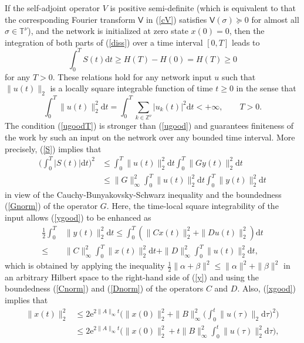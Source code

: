 \documentclass[letterpaper, 10pt, conference]{ieeeconf}  %
\def\<{\leqslant}           %
\def\>{\geqslant}           %
\def\mZ{\mathbb{Z}}    %
\def\re{\mathrm{e}}        %
\def\rd{\mathrm{d}}        %
\def\sV{\mathsf{V}}
\def\mT{\mathbb{T}}
\def\mZ{\mathbb{Z}}
\begin{document}
If the self-adjoint operator $V$ is positive semi-definite (which is equivalent to that the corresponding Fourier transform $\sV$ in (\ref{cV}) satisfies $\sV(\sigma) \succcurlyeq 0$ for almost all $\sigma \in \mT^\nu$), and the network is initialized at zero state $x(0)=0$, then the integration of both parts of (\ref{diss}) over a time interval $[0,T]$ leads to
\begin{equation}
\label{Wintpos}
  \int_0^T S(t)\rd t
  \>
  H(T)-H(0) = H(T)\> 0
\end{equation}
for any $T>0$.
These relations hold for any network input $u$ such that $\|u(t)\|_2$ is a locally square integrable function of time $t\>0$ in the sense that
\begin{equation}
\label{ugoodT}
    \int_0^T
    \|u(t)\|_2^2
    \rd t
    =
    \int_0^T
    \sum_{k\in \mZ^\nu}
    |u_k(t)|^2
    \rd t
    <+\infty,
    \qquad
    T>0.
\end{equation}
The condition (\ref{ugoodT}) is stronger than (\ref{ugood}) and guarantees finiteness of the work by such an input on the network over any bounded  time interval. More precisely, (\ref{S}) implies that
\begin{align}
\nonumber
  \Big(\int_0^T
  |S(t)|
  \rd t
  \Big)^2
  & \<
  \int_0^T
  \|u(t)\|_2^2\rd t
  \int_0^T
  \|Gy(t)\|_2^2\rd t  \\
\label{Wgood}
  & \<
  \|G\|_{\infty}^2
  \int_0^T
  \|u(t)\|_2^2\rd t
  \int_0^T
  \|y(t)\|_2^2\rd t
\end{align}
in view of the Cauchy-Bunyakovsky-Schwarz inequality and the boundedness (\ref{Gnorm}) of the operator $G$. Here, the time-local square integrability of the input allows (\ref{ygood}) to be enhanced as
\begin{align}
\nonumber
    \frac{1}{2}
  \int_0^T&
  \|y(t)\|_2^2\rd t
  \<
    \int_0^T
    (
    \|Cx(t)\|_2^2 +
    \|Du(t)\|_2^2
    )
    \rd t\\
\label{ygood1}
  \< &
    \|C\|_{\infty}^2
    \int_0^T
    \|x(t)\|_2^2
    \rd t
    +
    \|D\|_{\infty}^2
    \int_0^T
    \|u(t)\|_2^2
    \rd t,
\end{align}
which is obtained by applying the inequality $\frac{1}{2}\|\alpha + \beta\|^2 \< \|\alpha\|^2 + \|\beta\|^2$ in an arbitrary Hilbert space to the right-hand side of (\ref{y}) and using the boundedness (\ref{Cnorm}) and (\ref{Dnorm}) of the operators $C$ and $D$. Also, (\ref{xgood}) implies that
 \begin{align}
\nonumber
    \|x(t)\|_2^2
    & \<
    2
    \re^{2\|A\|_{\infty}t}
    \Big(
        \|x(0)\|_2^2
        +
    \|B\|_{\infty}^2
        \Big(
    \int_0^t
    \|u(\tau)\|_2
    \rd \tau
    \Big)^2
    \Big)\\
\label{xnormup}
    & \<
    2
    \re^{2\|A\|_{\infty}t}
    \Big(
        \|x(0)\|_2^2
        +
        t
    \|B\|_{\infty}^2
    \int_0^t
    \|u(\tau)\|_2^2
    \rd \tau
    \Big),
\end{align}
\end{document}
